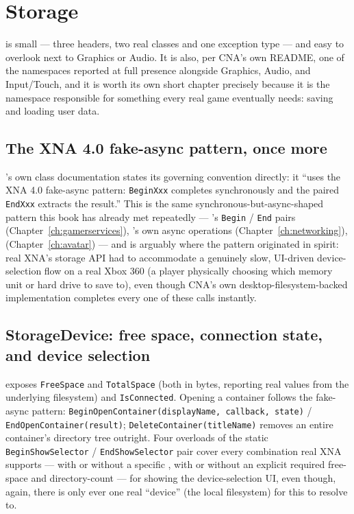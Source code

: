 \chapter{Storage}
\label{ch:storage}

 is small --- three headers, two real classes and
one exception type --- and easy to overlook next to Graphics or Audio. It is also, per CNA's
own README, one of the namespaces reported at full presence alongside Graphics, Audio, and
Input/Touch, and it is worth its own short chapter precisely because it is the namespace
responsible for something every real game eventually needs: saving and loading user data.

\section{The XNA 4.0 fake-async pattern, once more}

's own class documentation states its governing convention directly:
it ``uses the XNA 4.0 fake-async pattern: \texttt{BeginXxx} completes synchronously and the
paired \texttt{EndXxx} extracts the result.'' This is the same synchronous-but-async-shaped
pattern this book has already met repeatedly --- 's
\texttt{Begin} / \texttt{End} pairs (Chapter~\ref{ch:gamerservices}), 's own async
operations (Chapter~\ref{ch:networking}),  (Chapter~\ref{ch:avatar}) --- and
 is arguably where the pattern originated in spirit: real XNA's
storage API had to accommodate a genuinely slow, UI-driven device-selection flow on a real
Xbox 360 (a player physically choosing which memory unit or hard drive to save to), even
though CNA's own desktop-filesystem-backed implementation completes every one of these calls
instantly.

\section{StorageDevice: free space, connection state, and device selection}

 exposes \texttt{FreeSpace} and \texttt{TotalSpace} (both in bytes,
reporting real values from the underlying filesystem) and \texttt{IsConnected}. Opening a
container follows the fake-async pattern:
\texttt{BeginOpenContainer(displayName, callback, state)} / \texttt{EndOpenContainer(result)};
\texttt{DeleteContainer(titleName)} removes an entire container's directory tree outright.
Four overloads of the static \texttt{BeginShowSelector} / \texttt{EndShowSelector} pair cover
every combination real XNA supports --- with or without a specific ,
with or without an explicit required free-space and directory-count --- for showing the
device-selection UI, even though, again, there is only ever one real ``device'' (the local
filesystem) for this to resolve to.

